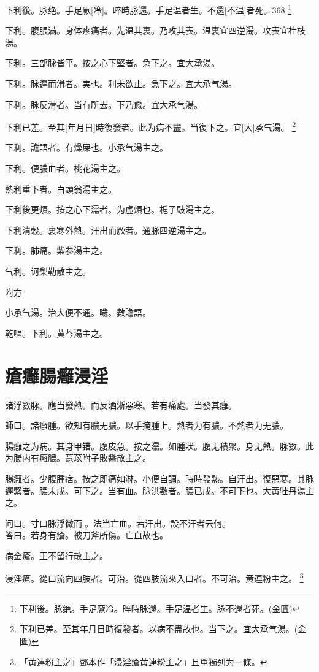 \documentclass[oneside,b4paper]{ctexbook}
\begin{document}
\begin{flushleft}
下利後。脉绝。手足厥[冷]。晬時脉還。手足温者生。不還[不温]者死。368
\footnote{下利後。脉绝。手足厥冷。晬時脉還。手足温者生。脉不還者死。(金匱)}

下利。腹脹滿。身体疼痛者。先温其裏。乃攻其表。温裏宜四逆湯。攻表宜桂枝湯。

下利。三部脉皆平。按之心下堅者。急下之。宜大承湯。

下利。脉遲而滑者。実也。利未欲止。急下之。宜大承气湯。

下利。脉反滑者。当有所去。下乃愈。宜大承气湯。

下利已差。至其[年月日]時復發者。此为病不盡。当復下之。宜[大]承气湯。
\footnote{下利已差。至其年月日時復發者。以病不盡故也。当下之。宜大承气湯。(金匱)}

下利。譫語者。有燥屎也。小承气湯主之。

下利。便膿血者。桃花湯主之。

熱利重下者。白頭翁湯主之。

下利後更煩。按之心下濡者。为虛煩也。梔子豉湯主之。

下利清穀。裏寒外熱。汗出而厥者。通脉四逆湯主之。

下利。肺痛。紫参湯主之。

气利。诃梨勒散主之。

附方

小承气湯。治大便不通。噦。數譫語。

乾嘔。下利。黄芩湯主之。

\chapter{瘡癰腸癰浸淫}

諸浮數脉。應当發熱。而反洒淅惡寒。若有痛處。当發其癰。

師曰。諸癰腫。欲知有膿无膿。以手掩腫上。熱者为有膿。不熱者为无膿。

腸癰之为病。其身甲错。腹皮急。按之濡。如腫狀。腹无積聚。身无熱。脉數。此为腸内有癰膿。薏苡附子敗醬散主之。

腸癰者。少腹腫痞。按之即痛如淋。小便自調。時時發熱。自汗出。復惡寒。其脉遲緊者。膿未成。可下之。当有血。脉洪數者。膿已成。不可下也。大黄牡丹湯主之。

问曰。寸口脉浮微而{𬈧}。法当亡血。若汗出。設不汗者云何。\\
答曰。若身有瘡。被刀斧所傷。亡血故也。

病金瘡。王不留行散主之。

浸淫瘡。從口流向四肢者。可治。從四肢流來入口者。不可治。黄連粉主之。
\footnote{「黄連粉主之」鄧本作「浸淫瘡黄連粉主之」且單獨列为一條。}


\end{flushleft}
\end{document}

